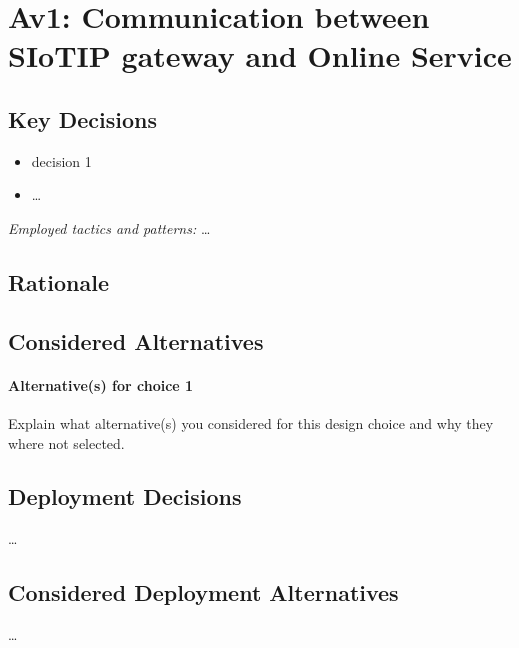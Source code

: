 \section{Av1: Communication between SIoTIP gateway and Online Service}


    \subsection*{Key Decisions}


        \begin{itemize}
        	\item decision 1
        	\item \ldots
        \end{itemize}
        \emph{Employed tactics and patterns:} \ldots


    \subsection*{Rationale}


    \subsection*{Considered Alternatives}
        \paragraph{Alternative(s) for choice 1} Explain what alternative(s) you
        considered for this design choice and why they where not selected.

    \subsection*{Deployment Decisions}
        \ldots

    \subsection*{Considered Deployment Alternatives}
        \ldots

